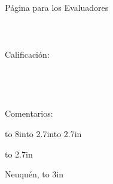 \thispagestyle{empty}

\label{pageval}
{\LARGE \sc P\'agina para los Evaluadores}
\ \\
\ \\
\ \\
\ \\
Calificaci\'on:\\
\ \\
\ \\
\ \\
\ \\
Comentarios:\\


\vspace{10cm}

\hbox to 8in{\hbox to 2.7in{\dotfill}\hspace{1cm}\hbox to 2.7in{\dotfill}}


\vspace{2cm}

\hfil\hbox to 2.7in{\dotfill}\hfil


\vfill

\hfill Neuquén, \hbox to 3in{\dotfill}



\pagebreak

